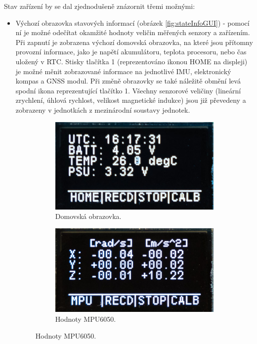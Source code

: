 Stav zařízení by se dal zjednodušeně znázornit třemi možnými:
\begin{itemize}
\item Výchozí obrazovka stavových informací (obrázek \ref{fig:stateInfoGUI}) - pomocí ní je možné odečítat okamžité hodnoty veličin měřených senzory a zařízením. Při zapnutí je zobrazena výchozí domovská obrazovka, na které jsou přítomny provozní informace, jako je napětí akumulátoru, teplota procesoru, nebo čas uložený v RTC. Stisky tlačítka 1 (reprezentováno ikonou HOME na displeji) je možné měnit zobrazované informace na jednotlivé IMU, elektronický kompas a GNSS modul. Při změně obrazovky se také náležitě obmění levá spodní ikona reprezentující tlačítko 1. Všechny senzorové veličiny (lineární zrychlení, úhlová rychlost, velikost magnetické indukce) jsou již převedeny a zobrazeny v jednotkách z mezinárodní soustavy jednotek.
\begin{figure}[h]
     \centering
     \begin{subfigure}[b]{0.29\textwidth}
         \centering
         \includegraphics[width=\textwidth]{obrazky/menuHome2}
         \caption{Domovská obrazovka.}
       
     \end{subfigure}
     \hfill
     \centering
     \begin{subfigure}[b]{0.29\textwidth}
         \centering
         \includegraphics[width=\textwidth]{obrazky/menuMPU}
         \caption{Hodnoty MPU6050.}
         

\end{subfigure}
\end{figure}
\end{itemize}
